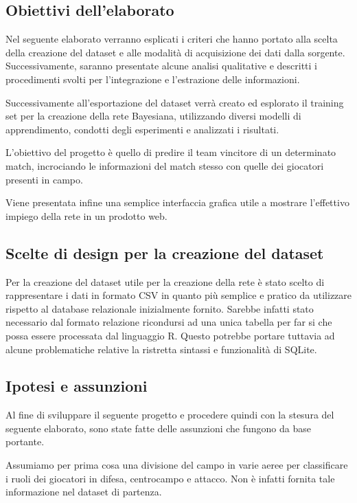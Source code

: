 \documentclass[hidelinks, 12pt]{article}
\begin{document}
\subsection{Obiettivi dell'elaborato}

Nel seguente elaborato verranno esplicati i criteri che hanno portato alla scelta della creazione del dataset e alle modalità di acquisizione dei dati dalla sorgente. Successivamente, saranno presentate alcune analisi qualitative e descritti i procedimenti svolti per l'integrazione e l'estrazione delle informazioni.

Successivamente all'esportazione del dataset verrà creato ed esplorato il training set per la creazione della rete Bayesiana, utilizzando diversi modelli di apprendimento, condotti degli esperimenti e analizzati i risultati.

L'obiettivo del progetto è quello di predire il team vincitore di un determinato match, incrociando le informazioni del match stesso con quelle dei giocatori presenti in campo.

Viene presentata infine una semplice interfaccia grafica utile a mostrare l'effettivo impiego della rete in un prodotto web.


\subsection{Scelte di design per la creazione del dataset}

Per la creazione del dataset utile per la creazione della rete è stato scelto di rappresentare i dati in formato CSV in quanto più semplice e pratico da utilizzare rispetto al database relazionale inizialmente fornito. Sarebbe infatti stato necessario dal formato relazione ricondursi ad una unica tabella per far si che possa essere processata dal linguaggio R. Questo potrebbe portare tuttavia ad alcune problematiche relative la ristretta sintassi e funzionalità di SQLite.



\subsection{Ipotesi e assunzioni}

Al fine di sviluppare il seguente progetto e procedere quindi con la stesura del seguente elaborato, sono state fatte delle assunzioni che fungono da base portante.

Assumiamo per prima cosa una divisione del campo in varie aeree per classificare i ruoli dei giocatori in difesa, centrocampo e attacco. Non è infatti fornita tale informazione nel dataset di partenza.
\end{document}
